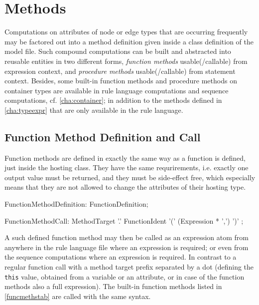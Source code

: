 \section{Methods}\label{sec:objectoriented}

Computations on attributes of node or edge types that are occurring frequently may be factored out into a method definition given inside a class definition of the model file.
Such compound computations can be built and abstracted into reusable entities in two different forms, \emph{function methods} usable(/callable) from expression context, and \emph{procedure methods} usable(/callable) from statement context.
Besides, some built-in function methods and procedure methods on container types are available in rule language computations and sequence computations, cf. \ref{cha:container};
in addition to the methods defined in \ref{cha:typeexpr} that are only available in the rule language.

\subsection{Function Method Definition and Call}\label{sub:functionmethods}\label{sec:funcmethcall} 

Function methods are defined in exactly the same way as a function is defined, just inside the hosting class.
They have the same requrirements, 
i.e. exactly one output value must be returned, 
and they must be side-effect free, which especially means that they are not allowed to change the attributes of their hosting type.

\begin{rail} 
  FunctionMethodDefinition: FunctionDefinition;
\end{rail}

\begin{rail}
  FunctionMethodCall: MethodTarget '.' FunctionIdent '(' (Expression * ',') ')' ;
\end{rail}

A such defined function method may then be called as an expression atom from anywhere in the rule language file where an expression is required; or even from the sequence computations where an expression is required.
In contrast to a regular function call with a method target prefix separated by a dot (defining the \texttt{this} value, obtained from a variable or an attribute, or in case of the function methods also a full expression).
The built-in function methods listed in \ref{funcmethstab} are called with the same syntax.


